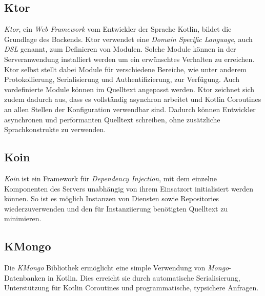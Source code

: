 \subsection{Ktor}
\label{subsec:backend:bibs:ktor}
\textit{Ktor}, ein \textit{Web Framework} vom Entwickler der Sprache Kotlin, bildet die Grundlage des Backends.
Ktor verwendet eine \textit{Domain Specific Language}, auch \textit{DSL} genannt, zum Definieren von Modulen.
Solche Module können in der Serveranwendung installiert werden um ein erwünschtes Verhalten zu erreichen.
Ktor selbst stellt dabei Module für verschiedene Bereiche, wie unter anderem Protokollierung, Serialisierung und Authentifizierung, zur Verfügung.
Auch vordefinierte Module können im Quelltext angepasst werden.
Ktor zeichnet sich zudem dadurch aus, dass es vollständig asynchron arbeitet und Kotlin Coroutines an allen Stellen der Konfiguration verwendbar sind.
Dadurch können Entwickler asynchronen und performanten Quelltext schreiben, ohne zusätzliche Sprachkonstrukte zu verwenden.

\subsection{Koin}
\label{subsec:backend:bibs:koin}
\textit{Koin} ist ein Framework für \textit{Dependency Injection}, mit dem einzelne Komponenten des Servers unabhängig von ihrem Einsatzort initialisiert werden können.
So ist es möglich Instanzen von Diensten sowie Repositories wiederzuverwenden und den für Instanziierung benötigten Quelltext zu minimieren.

\subsection{KMongo}
\label{subsec:backend:bibs:kmongo}
Die \textit{KMongo} Bibliothek ermöglicht eine simple Verwendung von \textit{Mongo}-Datenbanken in Kotlin.
Dies erreicht sie durch automatische Serialisierung, Unterstützung für Kotlin Coroutines und programmatische, typsichere Anfragen.

